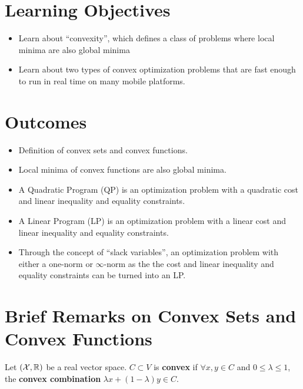 
\section*{Learning Objectives}

\begin{itemize}
\item Learn about ``convexity'', which defines a class of problems where local minima are also global minima
\item Learn about two types of convex optimization problems that are fast enough to run in real time on many mobile platforms.
\end{itemize}

\section*{Outcomes} 
\begin{itemize}
\item  Definition of convex sets and convex functions.
\item Local minima of convex functions are also global minima.
\item A Quadratic Program (QP) is an optimization problem with a quadratic cost and linear inequality and equality constraints.
\item A Linear Program (LP) is an optimization problem with a linear cost and linear inequality and equality constraints.
\item Through the concept of ``slack variables'', an optimization problem with either a one-norm or $\infty$-norm as the the cost and linear inequality and equality constraints can be turned into an LP.
\end{itemize}

\newpage

\section{Brief Remarks on Convex Sets and Convex Functions}

\begin{definition}  Let $(\mathcal{X},\mathbb R)$ be a real vector space. $C \subset V$ is \textbf{ convex} if $\forall x,y \in C $ and $ 0\le \lambda \le 1$, the \textbf{convex combination} $\lambda x +(1-\lambda)y \in C$.

\end{definition}



